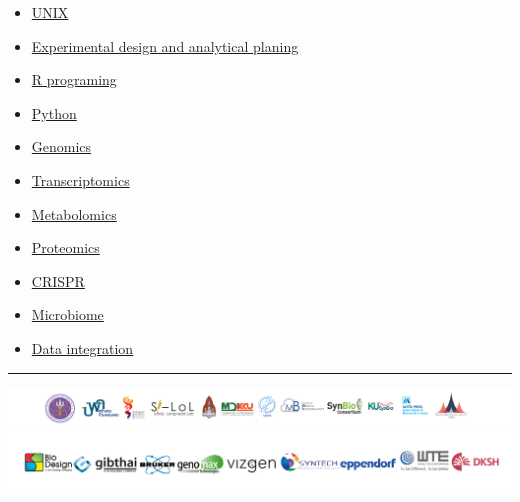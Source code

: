\documentclass[
]{article}
\begin{document}
\begin{itemize}
\item
  \href{./Page/elements/contents/02\%20UNIX\%20session/Content/UNIX_Document.html}{UNIX}
\item
  \href{./Page/elements/contents/01\%20Experimental\%20design/Content/HandsOn.html}{Experimental
  design and analytical planing}
\item
  \href{./Page/elements/contents/03\%20R\%20session/Content/Rdocument.html}{R
  programing}
\item
  \href{./Page/elements/contents/04\%20Python/Content/Content.html}{Python}
\item
  \href{./Page/elements/contents/05\%20Genomics/Content/Content.html}{Genomics}
\item
  \href{./Page/elements/contents/06\%20Transcriptomics/Content/RNA.html}{Transcriptomics}
\item
  \href{./Page/elements/contents/07\%20Metabolomics/Content/Introduction.html}{Metabolomics}
\item
  \href{./Page/elements/contents/08\%20Proteomics/Content/Introduction.html}{Proteomics}
\item
  \href{./Page/elements/contents/09\%20CRISPR/Content/Content.html}{CRISPR}
\item
  \href{./Page/elements/contents/10\%20Microbiome/Content/Microbiome.html}{Microbiome}
\item
  \href{./Page/elements/contents/11\%20Data\%20integration/Content/Content.html}{Data
  integration}
\end{itemize}

\begin{center}\rule{0.5\linewidth}{0.5pt}\end{center}

\includegraphics{Page/elements/img/Logo/Logo_Multi-omics_2.png}\includegraphics{Page/elements/img/Logo/Logo_Multi-omics_3.png}
\end{document}
